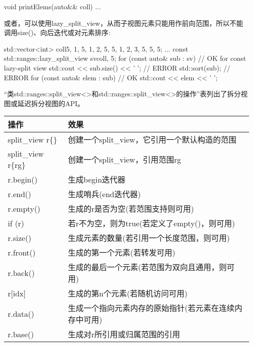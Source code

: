 \begin{cpp}
void printElems(auto&& coll) {
	...
}
\end{cpp}

或者，可以使用lazy\_split\_view，从而子视图元素只能用作前向范围，所以不能调用size()、向后迭代或对元素排序:

\begin{cpp}
std::vector<int> coll{5, 1, 5, 1, 2, 5, 5, 1, 2, 3, 5, 5, 5};
...
const std::ranges::lazy_split_view sv{coll, 5};
for (const auto& sub : sv) { // OK for const lazy-split view
	std::cout << sub.size() << ' '; // ERROR
	std::sort(sub); // ERROR
	for (const auto& elem : sub) { // OK
		std::cout << elem << ' ';
	}
}
\end{cpp}


“类std::ranges::split\_view<>和std::ranges::split\_view<>的操作”表列出了拆分视图或延迟拆分视图的API。

\begin{longtable}[c]{|l|l|}
\hline
\textbf{操作}  & \textbf{效果}                                                 \\ \hline
\endfirsthead
%
\endhead
%
split\_view r\{\} & 创建一个split\_view，它引用一个默认构造的范围                                   \\ \hline
split\_view r\{rg\} & 创建一个split\_view，引用范围rg                   \\ \hline
r.begin()           & 生成begin迭代器                                       \\ \hline
r.end()             & 生成哨兵(end迭代器)                              \\ \hline
r.empty()           & 生成的r是否为空(若范围支持则可用) \\ \hline
if (r)              & 若r不为空，则为true(若定义了empty()，则可用)         \\ \hline
r.size()          & 生成元素的数量(若引用一个长度范围，则可用)                              \\ \hline
r.front()           & 生成的第一个元素(若转发可用)               \\ \hline
r.back()            & 生成的最后一个元素(若范围为双向且通用，则可用)  \\ \hline
r{[}idx{]}          & 生成的第n个元素(若随机访问可用)            \\ \hline
r.data()          & 生成一个指向元素内存的原始指针(若元素在连续内存中可用) \\ \hline
r.base()            & 生成对r所引用或归属范围的引用        \\ \hline
\end{longtable}

